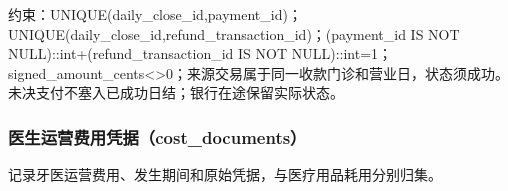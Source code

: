 \documentclass[UTF8,12pt,a4paper,fontset=none]{ctexart}
\begin{document}
约束：UNIQUE(\allowbreak{}daily\_\allowbreak{}close\_\allowbreak{}id,\allowbreak{}payment\_\allowbreak{}id)\allowbreak{}；UNIQUE(\allowbreak{}daily\_\allowbreak{}close\_\allowbreak{}id,\allowbreak{}refund\_\allowbreak{}transaction\_\allowbreak{}id)\allowbreak{}；(\allowbreak{}payment\_\allowbreak{}id IS NOT NULL)\allowbreak{}:\allowbreak{}:\allowbreak{}int+\allowbreak{}(\allowbreak{}refund\_\allowbreak{}transaction\_\allowbreak{}id IS NOT NULL)\allowbreak{}:\allowbreak{}:\allowbreak{}int=\allowbreak{}1；signed\_\allowbreak{}amount\_\allowbreak{}cents<\allowbreak{}>\allowbreak{}0；来源交易属于同一收款门诊和营业日，状态须成功。未决支付不塞入已成功日结；银行在途保留实际状态。\par
\Needspace{216pt}
\subsubsection{医生运营费用凭据（cost\_documents）}
记录牙医运营费用、发生期间和原始凭据，与医疗用品耗用分别归集。\par
\end{document}
